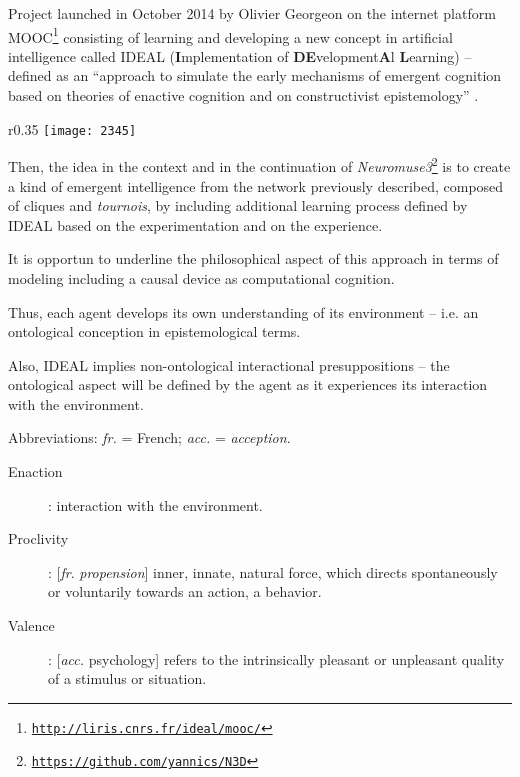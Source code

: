 Project launched in October 2014 by Olivier Georgeon on the internet platform MOOC\footnote{\href{http://liris.cnrs.fr/ideal/mooc/}{\texttt{\scriptsize http://liris.cnrs.fr/ideal/mooc/}}} consisting of learning and developing a new concept in artificial intelligence called IDEAL (\textbf{I}mplementation of \textbf{DE}velopment\textbf{A}l \textbf{L}earning) -- defined as an ``approach to simulate the early mechanisms of emergent cognition based on theories of enactive cognition and on constructivist epistemology'' \citep{ger}.

\begin{wrapfigure}{r}{0.35\textwidth}
\vspace{-5pt}
   \hspace{-5pt} 
   \texttt{[image: 2345]}
  \vspace{-20pt}
\end{wrapfigure}

\bigskip

Then, the idea in the context and in the continuation of \textsl{Neuromuse3}\footnote{\href{https://github.com/yannics/N3D}{\texttt{\scriptsize https://github.com/yannics/N3D}}} is to create a kind of emergent intelligence from the network previously described, composed of cliques and \textit{tournois}, by including additional learning process defined by IDEAL based on the experimentation and on the experience. 

\bigskip

It is opportun to underline the philosophical aspect of this approach in terms of modeling including a causal device as computational cognition.

Thus, each agent develops its own understanding of its environment -- i.e. an ontological conception in epistemological terms.

Also, IDEAL implies non-ontological interactional presuppositions -- the ontological aspect will be defined by the agent as it experiences its interaction with the environment.

\bigskip
\bigskip


\bigskip

Abbreviations: \textsl{fr.} = French; \textsl{acc.} = \textit{acception}.

\begin{description}
\item[Enaction]: interaction with the environment.
\item[Proclivity]: [\textsl{fr}. \textit{propension}] inner, innate, natural force, which directs spontaneously or voluntarily towards an action, a behavior.
\item[Valence]:  [\textsl{acc.} psychology] refers to the intrinsically pleasant or unpleasant quality of a stimulus or situation.
\end{description}

